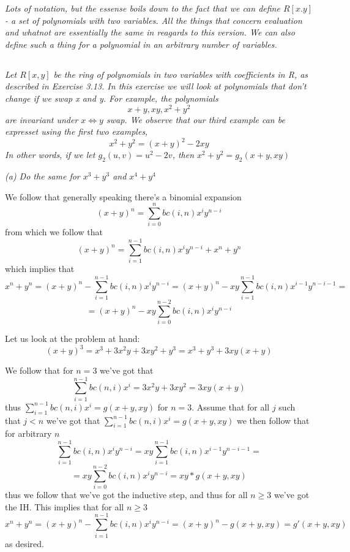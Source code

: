 \documentclass[11pt,oneside,titlepage]{book}
\DeclareMathOperator \lra {\Leftrightarrow}
\begin{document}
\textit{Lots of notation, but the essense boils down to the fact that
we can define $R[x. y]$ - a set of polynomials with two variables. All
the things that concern evaluation and whatnot are essentially the
same in reagards to this version. We can also define such a thing for
a polynomial in an arbitrary number of variables.}

\subsection{}

\textit{Let $R[x, y]$ be the ring of polynomials in two variables with
coefficients in R, as described in Exercise 3.13. In this exercise we
will look at polynomials that don’t change if we swap x and y. For
example, the polynomials
$$x + y, xy, x^2 + y^2$$
are invariant under $x \lra y$ swap. We observe that our third example
can be expresset using the first two examples,
$$x^2 + y^2 = (x + y)^2 - 2xy$$
In other words, if we let $g_2(u, v) = u^2 - 2v$, then $x^2 + y^2 =
g_2(x + y, xy)$}

\textit{(a) Do the same for $x^3 + y^3$ and $x^4 + y^4$}

We follow that generally speaking there's a binomial expansion
$$(x + y)^n = \sum_{i = 0}^n {bc(i, n)x^iy^{n - i}}$$
from which we follow that
$$(x + y)^n = \sum_{i = 1}^{n - 1} {bc(i, n)x^iy^{n - i}} + x^n + y^n$$
which implies that
$$ x^n + y^n = (x + y)^n -  \sum_{i = 1}^{n - 1} {bc(i, n)x^iy^{n - i}} =
(x + y)^n - xy \sum_{i = 1}^{n - 1} {bc(i, n)x^{i - 1}y^{n - i - 1}}
= $$
$$ = (x + y)^n -  xy \sum_{i = 0}^{n - 2} {bc(i, n)x^{i}y^{n - i}} $$

Let us look at the problem at hand:
$$(x + y)^3 = x^3 + 3x^2y + 3xy^2 + y^3 = x^3 + y^3 + 3xy(x + y)$$

We follow that for $n = 3$ we've got that
$$\sum_{i = 1}^{n - 1}{bc(n, i) x^i} = 3x^2y + 3xy^2 = 3xy(x + y)$$
thus $\sum_{i = 1}^{n - 1}{bc(n, i) x^i} = g(x + y, xy)$ for $n = 3$.
Assume that for all $j$ such that $j < n$ we've got that $\sum_{i =
1}^{n - 1}{bc(n, i) x^i} = g(x + y, xy)$ we then follow that for
arbitrary $n$
$$ \sum_{i = 1}^{n - 1} {bc(i, n)x^iy^{n - i}} =
xy \sum_{i = 1}^{n - 1} {bc(i, n)x^{i - 1}y^{n - i - 1}} = $$
$$ = xy \sum_{i = 0}^{n - 2} {bc(i, n)x^{i}y^{n - i}}  = xy * g(x + y, xy)$$
thus we follow that we've got the inductive step, and thus for all $n
\geq 3$ we've got the IH. This implies that for all $n \geq 3$
$$x^n + y^n = (x + y)^n -  \sum_{i = 1}^{n - 1} {bc(i, n)x^iy^{n - i}} =
(x + y)^n - g(x + y, xy) = g'(x + y, xy)$$ as desired.
\end{document}
